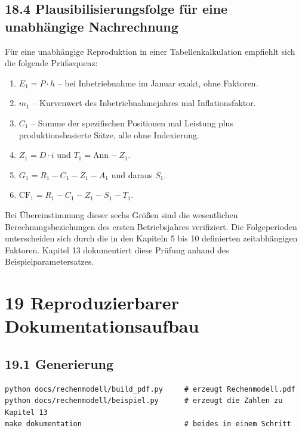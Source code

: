 \documentclass[
  a4paper,
  10pt]{article}
\providecommand{\tightlist}{%
  \setlength{\itemsep}{0pt}\setlength{\parskip}{0pt}}
\begin{document}
\hypertarget{plausibilisierungsfolge-fuxfcr-eine-unabhuxe4ngige-nachrechnung}{%
\subsection{18.4 Plausibilisierungsfolge für eine unabhängige
Nachrechnung}\label{plausibilisierungsfolge-fuxfcr-eine-unabhuxe4ngige-nachrechnung}}

Für eine unabhängige Reproduktion in einer Tabellenkalkulation empfiehlt
sich die folgende Prüfsequenz:

\begin{enumerate}
\def\labelenumi{\arabic{enumi}.}
\tightlist
\item
  \(E_1 = P \cdot h\) -- bei Inbetriebnahme im Januar exakt, ohne
  Faktoren.
\item
  \(m_1\) -- Kurvenwert des Inbetriebnahmejahres mal Inflationsfaktor.
\item
  \(C_1\) -- Summe der spezifischen Positionen mal Leistung plus
  produktionsbasierte Sätze, alle ohne Indexierung.
\item
  \(Z_1 = D \cdot i\) und \(T_1 = \mathrm{Ann} - Z_1\).
\item
  \(G_1 = R_1 - C_1 - Z_1 - A_1\) und daraus \(S_1\).
\item
  \(\mathrm{CF}_1 = R_1 - C_1 - Z_1 - S_1 - T_1\).
\end{enumerate}

Bei Übereinstimmung dieser sechs Größen sind die wesentlichen
Berechnungsbeziehungen des ersten Betriebsjahres verifiziert. Die
Folgeperioden unterscheiden sich durch die in den Kapiteln 5 bis 10
definierten zeitabhängigen Faktoren. Kapitel 13 dokumentiert diese
Prüfung anhand des Beispielparametersatzes.

\hypertarget{reproduzierbarer-dokumentationsaufbau}{%
\section{19 Reproduzierbarer
Dokumentationsaufbau}\label{reproduzierbarer-dokumentationsaufbau}}

\hypertarget{generierung}{%
\subsection{19.1 Generierung}\label{generierung}}

\begin{verbatim}
python docs/rechenmodell/build_pdf.py     # erzeugt Rechenmodell.pdf
python docs/rechenmodell/beispiel.py      # erzeugt die Zahlen zu Kapitel 13
make dokumentation                        # beides in einem Schritt
\end{verbatim}
\end{document}
